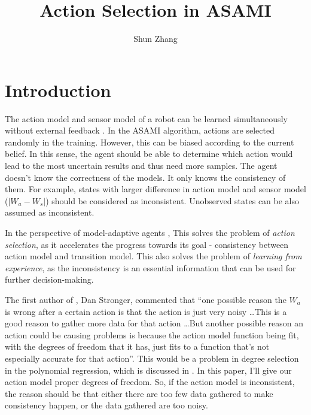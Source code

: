\documentclass[10pt]{article}
\title{Action Selection in ASAMI}
\author{Shun Zhang}
\date{}
\begin{document}
\maketitle


\sloppy

\section{Introduction}

The action model and sensor model of a robot can be learned
simultaneously without external feedback \cite{CSJ06}.  In the ASAMI
algorithm, actions are selected randomly in the training. However,
this can be biased according to the current belief.  In this sense,
the agent should be able to determine which action would lead to the
most uncertain results and thus need more samples.  The agent doesn't
know the correctness of the models. It only knows the consistency of
them. For example, states with larger difference in action model and
sensor model ($|W_a - W_s|$) should be considered as inconsistent.
Unobserved states can be also assumed as inconsistent.

In the perspective of model-adaptive agents \cite{maes1993modeling},
This solves the problem of \textit{action selection}, as it
accelerates the progress towards its goal - consistency between action
model and transition model. This also solves the problem of
\textit{learning from experience}, as the inconsistency is an
essential information that can be used for further decision-making.

The first author of \cite{CSJ06}, Dan Stronger, commented that ``one
possible reason the $W_a$ is wrong after a certain action is that the
action is just very noisy \ldots This is a good reason to gather more
data for that action \ldots  But another possible reason  an action
could be causing problems is because the action model function being
fit, with the degrees of freedom that it has, just fits to a function
that's not especially accurate for that action''. This would be a
problem in degree selection in the polynomial regression, which is
discussed in \cite{IJAIT08-stronger}. In this paper, I'll give our
action model proper degrees of freedom. So, if the action model is
inconsistent, the reason should be that either there are too few data
gathered to make consistency happen, or the data gathered are too
noisy.
\end{document}
